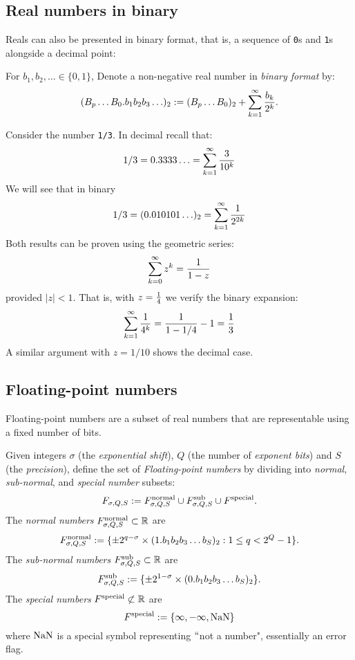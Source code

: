 \subsection{Real numbers in binary}
Reals can also be presented in binary format, that is, a sequence of \texttt{0}s and \texttt{1}s alongside a decimal point:

\begin{definition} For $b_1,b_2,\ensuremath{\ldots}\in \{0,1\}$, Denote a non-negative real number in \emph{binary format} by:
\[
(B_p \ensuremath{\ldots}B_0.b_1b_2b_3\ensuremath{\ldots})_2 := (B_p \ensuremath{\ldots}B_0)_2 +  \sum_{k=1}^\ensuremath{\infty} {b_k \over 2^k}.
\]
\end{definition}

\begin{example} Consider the number \texttt{1/3}.  In decimal recall that:
\[
1/3 = 0.3333\ensuremath{\ldots}=  \sum_{k=1}^\ensuremath{\infty} {3 \over 10^k}
\]
We will see that in binary
\[
1/3 = (0.010101\ensuremath{\ldots})_2 = \sum_{k=1}^\ensuremath{\infty} {1 \over 2^{2k}}
\]
Both results can be proven using the geometric series:
\[
\sum_{k=0}^\ensuremath{\infty} z^k = {1 \over 1 - z}
\]
provided $|z| < 1$. That is, with $z = {1 \over 4}$ we verify the binary expansion:
\[
\sum_{k=1}^\ensuremath{\infty} {1 \over 4^k} = {1 \over 1 - 1/4} - 1 = {1 \over 3}
\]
A similar argument with $z = 1/10$ shows the decimal case. \end{example}

\subsection{Floating-point numbers}
Floating-point numbers are a subset of real numbers that are representable using a fixed number of bits.

\begin{definition} Given integers $\ensuremath{\sigma}$ (the \emph{exponential shift}), $Q$ (the number of \emph{exponent bits}) and  $S$ (the \emph{precision}), define the set of \emph{Floating-point numbers} by dividing into \emph{normal}, \emph{sub-normal}, and \emph{special number} subsets:
\[
F_{\ensuremath{\sigma},Q,S} := F^{\rm normal}_{\ensuremath{\sigma},Q,S} \cup F^{\rm sub}_{\ensuremath{\sigma},Q,S} \cup F^{\rm special}.
\]
The \emph{normal numbers} $F^{\rm normal}_{\sigma,Q,S} \subset {\mathbb R}$ are
\[
F^{\rm normal}_{\ensuremath{\sigma},Q,S} := \{\ensuremath{\pm} 2^{q-\ensuremath{\sigma}} \ensuremath{\times} (1.b_1b_2b_3\ensuremath{\ldots}b_S)_2 : 1 \ensuremath{\leq} q < 2^Q-1 \}.
\]
The \emph{sub-normal numbers} $F^{\rm sub}_{\sigma,Q,S} \subset {\mathbb R}$ are
\[
F^{\rm sub}_{\ensuremath{\sigma},Q,S} := \{\ensuremath{\pm} 2^{1-\ensuremath{\sigma}} \ensuremath{\times} (0.b_1b_2b_3\ensuremath{\ldots}b_S)_2\}.
\]
The \emph{special numbers} $F^{\rm special} \not\subset {\mathbb R}$ are 
\[
F^{\rm special} :=  \{\ensuremath{\infty}, -\ensuremath{\infty}, {\rm NaN}\}
\]
where ${\rm NaN}$ is a special symbol representing \ensuremath{\ldq}not a number", essentially an error flag. \end{definition}

